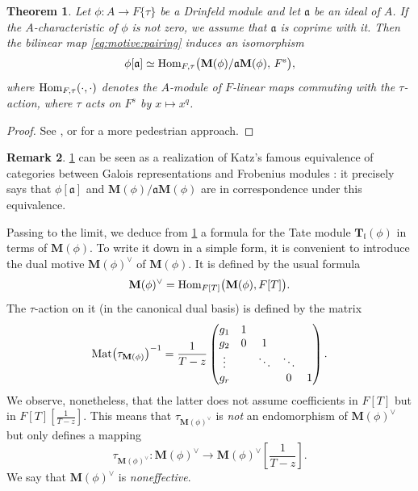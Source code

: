 \documentclass[11pt]{article}
\newtheorem{theorem}{Theorem}[section]
\theoremstyle{definition}
\newtheorem{remark}[theorem]{Remark}
\newcommand{\Hom}{\text{\rm Hom}}
\newcommand{\MM}{\mathbf{M}}
\newcommand{\TT}{\mathbf{T}}
\newcommand{\fll}{\mathfrak{l}}
\newcommand{\Fs}{F^{\text{\rm s}}}
\newcommand{\Mat}{\text{\rm Mat}}
\begin{document}
\begin{theorem}
\label{th:motive:torsion}
Let $\phi : A \to F\{\tau\}$ be a Drinfeld module and let 
$\mathfrak a$ be an ideal of $A$. If the $A$-characteristic of $\phi$
is not zero, we assume that $\mathfrak a$ is coprime with it.
Then the bilinear map
\eqref{eq:motive:pairing} induces an isomorphism
$$\phi[\mathfrak a] \simeq
  \Hom_{F, \tau}\big(\MM(\phi)/\mathfrak a \MM(\phi), \, \Fs \big),$$
where $\Hom_{F, \tau}(\cdot,\cdot)$ denotes the $A$-module of $F$-linear maps commuting with the $\tau$-action, where $\tau$ acts on $F^s$ by $x \mapsto x^q$.
\end{theorem}
\begin{proof}
See \cite[\S 5.4]{G98}, or \cite[\S 2.1]{CL23} for a more
pedestrian approach.
\end{proof}

\begin{remark}
\cref{th:motive:torsion} can be seen as a realization
of Katz's famous equivalence of categories between Galois
representations and Frobenius modules \cite[Proposition~4.1.1]{K73}:
it precisely says that $\phi[\mathfrak a]$ and $\MM(\phi)/ \mathfrak a 
\MM(\phi)$ are in correspondence under this equivalence.
\end{remark}

Passing to the limit, we deduce from \cref{th:motive:torsion}
a formula for the Tate module $\TT_\fll(\phi)$ in terms of $\MM(\phi)$.
To write it down in a simple form, it is convenient to
introduce the dual motive $\MM(\phi)^\vee$ of $\MM(\phi)$.
It is defined by the usual formula
$$\MM(\phi)^\vee = \Hom_{F[T]}\big(\MM(\phi), F[T]\big).$$
The $\tau$-action on it (in the canonical dual basis) is defined
by the matrix
\begin{equation}
\label{eq:motive:matrixtaudual}
\Mat\big(\tau_{\MM(\phi)}\big)^{-1} =
\frac 1{T-z} 
\left( \begin{matrix}
g_1 & 1 \\
g_2 & 0 & 1 \\
\vdots  & & \ddots & \ddots \\
g_r &   &  & 0 & 1 \\
\end{matrix} \right).
\end{equation}
We observe, nonetheless, that the latter does not assume coefficients
in $F[T]$ but in $F[T][\frac 1{T-z}]$.
This means that $\tau_{\MM(\phi)^\vee}$ is \emph{not} an endomorphism
of $\MM(\phi)^\vee$ but only defines a mapping
$$\tau_{\MM(\phi)^\vee} :
  \MM(\phi)^\vee \to \MM(\phi)^\vee\left[\frac 1{T-z}\right].$$
We say that $\MM(\phi)^\vee$ is \emph{noneffective}.
\end{document}
